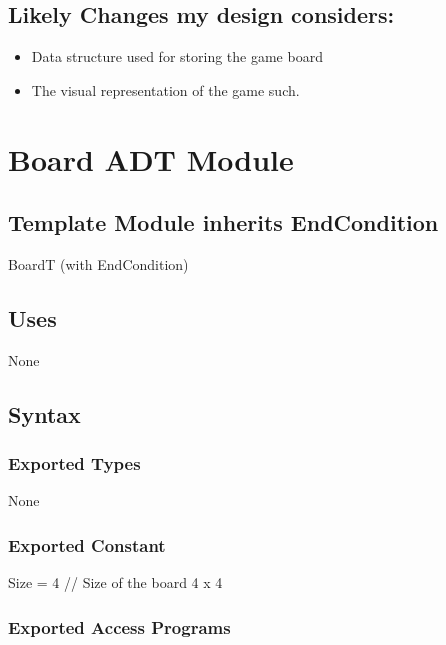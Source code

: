 \documentclass[12pt]{article}
\begin{document}
\subsection*{Likely Changes my design considers:}

\begin{itemize}
  \item Data structure used for storing the game board
  \item The visual representation of the game such. 
\end{itemize}




\newpage

\section* {Board ADT Module}

\subsection*{Template Module inherits EndCondition}

BoardT (with EndCondition)

\subsection* {Uses}

None

\subsection* {Syntax}

\subsubsection* {Exported Types}

None

\subsubsection* {Exported Constant}

Size = 4 \quad // Size of the board 4 x 4

\subsubsection* {Exported Access Programs}
\end{document}
